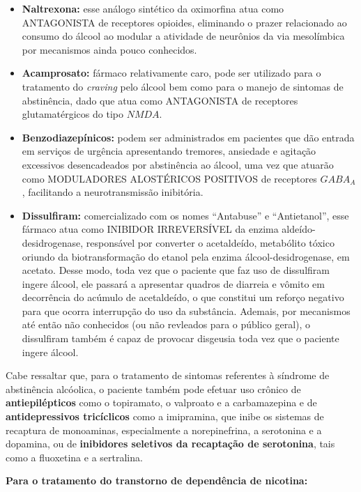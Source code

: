 \documentclass[
]{book}
\begin{document}
\begin{itemize}
\item
  \textbf{Naltrexona:} esse análogo sintético da oximorfina atua como ANTAGONISTA de receptores opioides, eliminando o prazer relacionado ao consumo do álcool ao modular a atividade de neurônios da via mesolímbica por mecanismos ainda pouco conhecidos.
\item
  \textbf{Acamprosato:} fármaco relativamente caro, pode ser utilizado para o tratamento do \emph{craving} pelo álcool bem como para o manejo de sintomas de abstinência, dado que atua como ANTAGONISTA de receptores glutamatérgicos do tipo \(NMDA\).
\item
  \textbf{Benzodiazepínicos:} podem ser administrados em pacientes que dão entrada em serviços de urgência apresentando tremores, ansiedade e agitação excessivos desencadeados por abstinência ao álcool, uma vez que atuarão como MODULADORES ALOSTÉRICOS POSITIVOS de receptores \(GABA_A\), facilitando a neurotransmissão inibitória.
\item
  \textbf{Dissulfiram:} comercializado com os nomes ``Antabuse'' e ``Antietanol'', esse fármaco atua como INIBIDOR IRREVERSÍVEL da enzima aldeído-desidrogenase, responsável por converter o acetaldeído, metabólito tóxico oriundo da biotransformação do etanol pela enzima álcool-desidrogenase, em acetato. Desse modo, toda vez que o paciente que faz uso de dissulfiram ingere álcool, ele passará a apresentar quadros de diarreia e vômito em decorrência do acúmulo de acetaldeído, o que constitui um reforço negativo para que ocorra interrupção do uso da substância. Ademais, por mecanismos até então não conhecidos (ou não revleados para o público geral), o dissulfiram também é capaz de provocar disgeusia toda vez que o paciente ingere álcool.
\end{itemize}

Cabe ressaltar que, para o tratamento de sintomas referentes à síndrome de abstinência alcóolica, o paciente também pode efetuar uso crônico de \textbf{antiepilépticos} como o topiramato, o valproato e a carbamazepina e de \textbf{antidepressivos tricíclicos} como a imipramina, que inibe os sistemas de recaptura de monoaminas, especialmente a norepinefrina, a serotonina e a dopamina, ou de \textbf{inibidores seletivos da recaptação de serotonina}, tais como a fluoxetina e a sertralina.

\textbf{Para o tratamento do transtorno de dependência de nicotina:}
\end{document}
